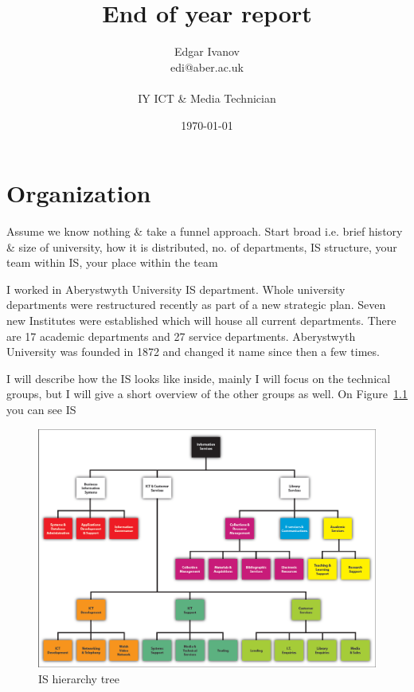 \documentclass[10pt,a4paper,headinclude=true]{report}
\begin{document}
\title{End of year report}
\author{Edgar Ivanov\\ edi@aber.ac.uk \\ \\ IY ICT \& Media Technician}
\date{\today}
\maketitle

\tableofcontents

\chapter{Organization}
Assume we know nothing \& take a funnel approach. Start broad i.e. brief history \&
size of university, how it is distributed, no. of departments, IS structure, your
team within IS, your place within the team

I worked in Aberystwyth University IS department. Whole university departments were restructured recently as part of a new strategic plan. Seven new Institutes were established which will house all current departments. There are 17 academic departments and 27 service departments. Aberystwyth University was founded in 1872 and changed it name since then a few times. 



I will describe how the IS looks like inside, mainly I will focus on the technical groups, but I will give a short overview of the other groups as well. On Figure~\ref{fig:i-s-hierarchy-tree-march-2012} you can see IS

\begin{figure}[htbp]
\centering
\centerline{\includegraphics[scale=0.5]{./i-s-hierarchy-tree-march-2012}}
\caption{IS hierarchy tree}
\label{fig:i-s-hierarchy-tree-march-2012}
\end{figure}
\end{document}
